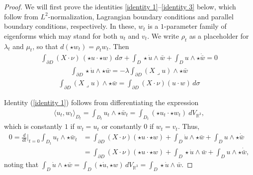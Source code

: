 \documentclass[10pt,a4paper]{amsart}
\newcommand{\iprod}{\mathbin{\lrcorner}}
\begin{document}
\begin{proof}
We will first prove the identities \eqref{identity 1}--\eqref{identity 3} below, which follow from $L^2$-normalization, Lagrangian boundary conditions and parallel boundary conditions, respectively. In these, $w_t$ is a $1$-parameter family of eigenforms which may stand for both $u_t$ and $v_t$. We write $\rho_t$ as a placeholder for $\lambda_t$ and $\mu_t$, so that $d ( \star w_t ) = \rho_t w_t$. Then
\begin{align}\label{identity 1}
    \int_{\partial D} (X\cdot \nu)\,( \star u \cdot \star w)\,d\sigma + \int_{D} \star \Dot{u}\wedge \bar w +\int_{D} u\wedge \star \Dot{\bar w} =0
\end{align}
\begin{align}\label{identity 2}
    \int_{\partial D}\star\dot{u}\wedge\star \bar w= - \lambda \int_{\partial D} (X\iprod u) \wedge \star \bar w
\end{align}
\begin{align}\label{identity 3}
    \int_{\partial D} (X \iprod u) \wedge \star \bar w=\int_{\partial D} (X\cdot \nu) (u \cdot w)\,d\sigma
\end{align}

Identity (\ref{identity 1}) follows from differentiating the expression
\begin{align*}
\langle u_t,w_t\rangle_{D_t} = \int_{ D_t}u_t\wedge \star \bar w_t = \int_{D_t} (\star u_t \cdot \star w_t) \ dV_{\mathbb R^3},
\end{align*}
which is constantly $1$ if $w_t = u_t$ or constantly $0$ if $w_t = v_t$. Thus,
\begin{align*}
    0 = \frac{d}{dt}\lvert_{t=0} \int_{ D_t} u_t \wedge \star \bar w_t &= \int_{\partial D} (X \cdot \nu) (\star u \cdot \star w) + \int_{D} \dot u \wedge \star \bar w + \int_D u \wedge \star \dot{\bar w} \\
    &= \int_{\partial D} (X \cdot \nu) (\star u \cdot \star w) + \int_{D} \star \dot u \wedge \bar w + \int_D u \wedge \star \dot{\bar w},
\end{align*}
noting that $\int_D \dot u \wedge \star {\bar w} = \int_D (\star \dot u, \star w) \, dV_{\mathbb R^3} = \int_D \star \dot u \wedge \bar w$.



\end{proof}
\end{document}

